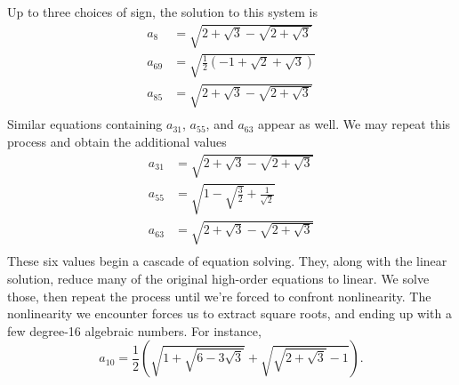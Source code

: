 Up to three choices of sign, the solution to this system is
\begin{align*}
    a_{8} & = \sqrt{2+\sqrt{3}-\sqrt{2+\sqrt{3}}} \\
    a_{69} & = \sqrt{\frac{1}{2} \left(-1+\sqrt{2}+\sqrt{3}\right)} \\
    a_{85} & = \sqrt{2+\sqrt{3}-\sqrt{2+\sqrt{3}}} \\
\end{align*}
Similar equations containing $a_{31}$, $a_{55}$, and $a_{63}$ appear as well. 
We may repeat this process and obtain the additional values
\begin{align*}
    a_{31} & = \sqrt{2+\sqrt{3}-\sqrt{2+\sqrt{3}}} \\
    a_{55} & = \sqrt{1-\sqrt{\frac{3}{2}}+\frac{1}{\sqrt{2}}} \\
    a_{63} & = \sqrt{2+\sqrt{3}-\sqrt{2+\sqrt{3}}} \\
\end{align*}
These six values begin a cascade of equation solving. 
They, along with the linear solution, reduce many of the original high-order equations to linear. 
We solve those, then repeat the process until we're forced to confront nonlinearity. 
The nonlinearity we encounter forces us to extract square roots, and ending up with a few degree-16 algebraic numbers. 
For instance,
\[
    a_{10} = \frac{1}{2} \left(\sqrt{1+\sqrt{6-3 \sqrt{3}}}+\sqrt{\sqrt{2+\sqrt{3}}-1}\right).
\]

